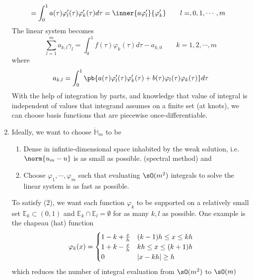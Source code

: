 \documentclass[11pt]{article}
\begin{document}
\begin{definition*}
\begin{enumerate}
\begin{align*}
            &= \int_0^1 a(\tau) \varphi_l'(\tau) \varphi_k'(\tau) d\tau 
            = \inner{a\varphi_l'}{\varphi_k'} \quad \quad l=,0,1,\cdots,m
        \end{align*}
        The linear system becomes
        \[
            \sum_{l=1}^m a_{k,l} \gamma_l = \int_0^1 f(\tau) \varphi_k(\tau) d\tau - a_{k,0} \quad \quad k=1,2,\cdots,m    
        \]
        where 
        \[
            a_{k,l} = \int_0^1 \pb{
                a(\tau) \varphi'_l(\tau) \varphi'_k(\tau) + b(\tau) \varphi_l(\tau) \varphi_k(\tau)
            } d\tau
        \]
        With the help of integration by parts, and knowledge that value of integral is independent of values that integrand assumes on a finite set (at knots), we can choose basis functions that are piecewise once-differentiable.
        \item {} Ideally, we want to choose $\mathring{\mathbb{H}}_m$ to be 
        \begin{enumerate}
            \item Dense in infintie-dimensional space inhabited by the weak solution, i.e. $\norm{u_m - u}$ is as small as possible. (spectral method) and
            \item Choose $\varphi_1,\cdots,\varphi_m$ such that evaluating $\sO(m^2)$ integrals to solve the linear system is as fast as possible.
        \end{enumerate}
        To satisfy (2), we want each function $\varphi_k$ to be supported on a relatively small set $\mathbb{E}_k \subset (0,1)$ and $\mathbb{E}_k \cap \mathbb{E}_l = \emptyset$ for as many $k,l$ as possible. One example is the chapeau (hat) function
        \[
            \varphi_k(x) = 
            \begin{cases}
                1 - k + \frac{x}{h} & (k-1)h \leq x \leq kh \\
                1 + k - \frac{x}{h} & kh \leq x \leq (k+1)h \\
                0 & \left|x-kh\right| \geq h
            \end{cases}     
        \]
        which reduces the number of integral evaluation from $\sO(m^2)$ to $\sO(m)$
    \end{enumerate}
\end{definition*} 
\end{document}
